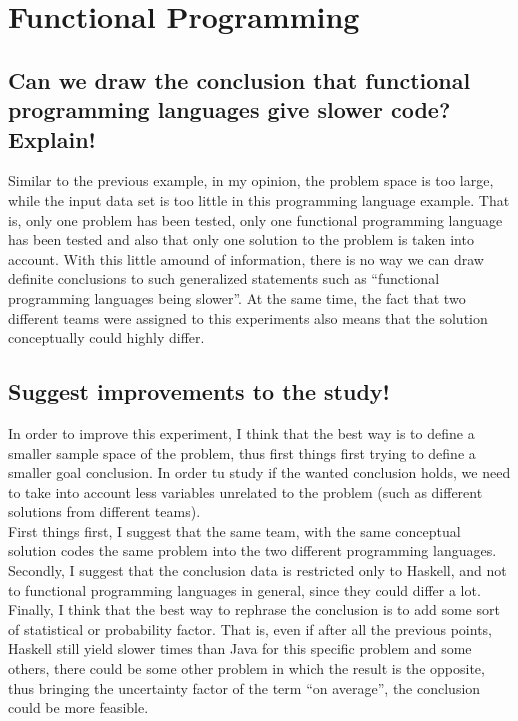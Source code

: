 \documentclass[english]{report}
\begin{document}
\clearpage

\section{Functional Programming}

\subsection{Can we draw the conclusion that functional programming languages give slower code? Explain!}

Similar to the previous example, in my opinion, the problem space is too large, while the input data set is too little in this programming language example. That is, only one problem has been tested, only one functional programming language has been tested and also that only one solution to the problem is taken into account. With this little amound of information, there is no way we can draw definite conclusions to such generalized statements such as ``functional programming languages being slower''. At the same time, the fact that two different teams were assigned to this experiments also means that the solution conceptually could highly differ.

\subsection{Suggest improvements to the study!}

In order to improve this experiment, I think that the best way is to define a smaller sample space of the problem, thus first things first trying to define a smaller goal conclusion. In order tu study if the wanted conclusion holds, we need to take into account less variables unrelated to the problem (such as different solutions from different teams).\\
First things first, I suggest that the same team, with the same conceptual solution codes the same problem into the two different programming languages.\\
Secondly, I suggest that the conclusion data is restricted only to Haskell, and not to functional programming languages in general, since they could differ a lot.
Finally, I think that the best way to rephrase the conclusion is to add some sort of statistical or probability factor. That is, even if after all the previous points, Haskell still yield slower times than Java for this specific problem and some others, there could be some other problem in which the result is the opposite, thus bringing the uncertainty factor of the term ``on average'', the conclusion could be more feasible.
\end{document}
